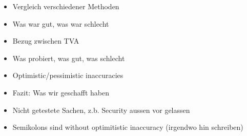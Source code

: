 \documentclass[ngerman]{article}
\begin{document}
\begin{itemize}
    \item Vergleich verschiedener Methoden
    \item Was war gut, was war schlecht
    \item Bezug zwischen TVA
    \item Was probiert, was gut, was schlecht
    \item Optimistic/pessimistic inaccuracies
    \item Fazit: Was wir geschafft haben
    \item Nicht getestete Sachen, z.b. Security aussen vor gelassen
    \item Semikolons sind without optimitistic inaccuracy (irgendwo hin schreiben)
\end{itemize}
\end{document}
